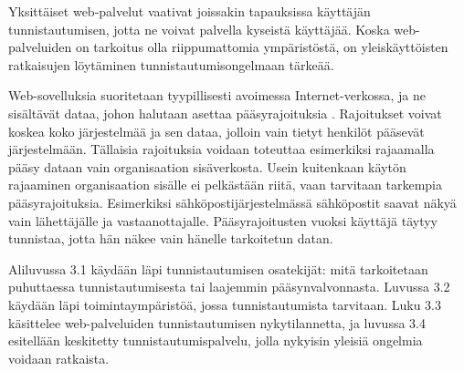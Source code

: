 Yksittäiset web-palvelut vaativat joissakin tapauksissa käyttäjän tunnistautumisen, jotta ne voivat palvella kyseistä käyttäjää. Koska web-palveluiden on tarkoitus olla riippumattomia ympäristöstä, on yleiskäyttöisten ratkaisujen löytäminen tunnistautumisongelmaan tärkeää.

Web-sovelluksia suoritetaan tyypillisesti avoimessa Internet-verkossa, ja ne sisältävät dataa, johon halutaan asettaa pääsyrajoituksia \cite{inside_the_identity_management_game}. Rajoitukset voivat koskea koko järjestelmää ja sen dataa, jolloin vain tietyt henkilöt pääsevät järjestelmään. Tällaisia rajoituksia voidaan toteuttaa esimerkiksi rajaamalla pääsy dataan vain organisaation sisäverkosta. Usein kuitenkaan käytön rajaaminen organisaation sisälle ei pelkästään riitä, vaan tarvitaan tarkempia pääsyrajoituksia. Esimerkiksi sähköpostijärjestelmässä sähköpostit saavat näkyä vain lähettäjälle ja vastaanottajalle. Pääsyrajoitusten vuoksi käyttäjä täytyy tunnistaa, jotta hän näkee vain hänelle tarkoitetun datan.

Aliluvussa 3.1 käydään läpi tunnistautumisen osatekijät: mitä tarkoitetaan puhuttaessa tunnistautumisesta tai laajemmin pääsynvalvonnasta. Luvussa 3.2 käydään läpi toimintaympäristöä, jossa tunnistautumista tarvitaan. Luku 3.3 käsittelee web-palveluiden tunnistautumisen nykytilannetta, ja luvussa 3.4 esitellään keskitetty tunnistautumispalvelu, jolla nykyisin yleisiä ongelmia voidaan ratkaista.